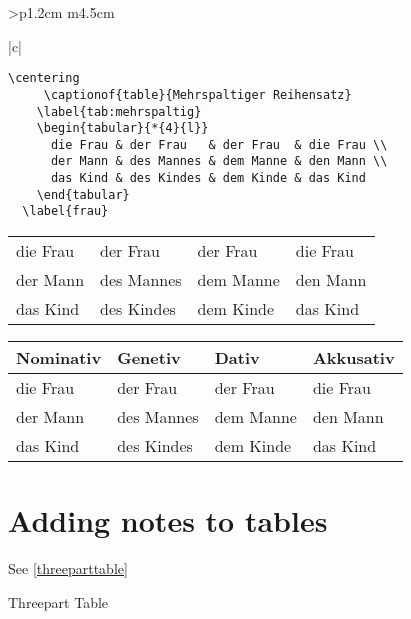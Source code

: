 \begin{tabular}{>{\bfseries}p{1.2cm} m{4.5cm}}
\begin{tabular}[t]{|c|}
\begin{longtable}
\begin{scriptexample}{}{}
\begin{scriptexample}{}{}
\begin{verbatim}
\centering
     \captionof{table}{Mehrspaltiger Reihensatz}
    \label{tab:mehrspaltig}
    \begin{tabular}{*{4}{l}}
      die Frau & der Frau   & der Frau  & die Frau \\
      der Mann & des Mannes & dem Manne & den Mann \\
      das Kind & des Kindes & dem Kinde & das Kind
    \end{tabular}
  \label{frau}
\end{verbatim}
{    \centering
    \label{tab:mehrspaltig}
    \begin{tabular}{*{4}{l}}
      die Frau & der Frau   & der Frau  & die Frau \\
      der Mann & des Mannes & dem Manne & den Mann \\
      das Kind & des Kindes & dem Kinde & das Kind
    \end{tabular}
  \label{frau}
  
 }

\end{scriptexample}



{    \centering
    \label{tab:tabellensatz}
    \begin{tabular}{@{}*{4}{l}@{}}
      \toprule
        Nominativ & Genetiv & Dativ & Akkusativ \\
      \midrule
        die Frau & der Frau   & der Frau  & die Frau \\
        der Mann & des Mannes & dem Manne & den Mann \\
        das Kind & des Kindes & dem Kinde & das Kind \\
      \bottomrule
    \end{tabular}
} 

\section{Adding notes to tables}
See \ref{threeparttable}

\begin{texexample}{Threepart Table}{}
  {\begin{center}


\end{center}}
\end{texexample}
\end{scriptexample}
\end{longtable}
\end{tabular}
\end{tabular}
